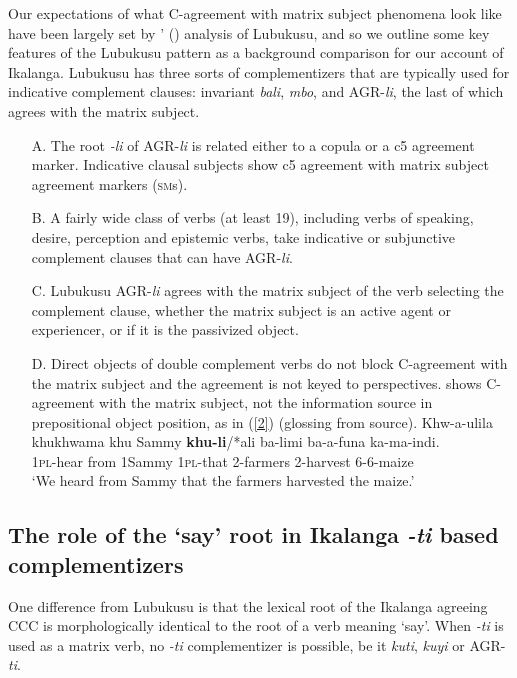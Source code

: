 \documentclass[output=paper,
modfonts
]{langscibook}
\begin{document}
Our expectations of what C-agreement with matrix subject phenomena look like have been largely set by \citeauthor{Diercks2013}' (\citeyear{Diercks2013}) analysis of Lubukusu, and so we outline some key features of the Lubukusu pattern as a background comparison for our account of Ikalanga. Lubukusu has three sorts of complementizers that are typically used for indicative complement clauses: invariant \textit{bali}, \textit{mbo}, and AGR-\textit{li}, the last of which agrees with the matrix subject. 
\begin{enumerate}
\item[A.] The root \textit{-li} of AGR-\textit{li} is related either to a copula or a c5 agreement marker. Indicative clausal subjects show c5 agreement with matrix subject agreement markers (\textsc{sm}s). 
\item[B.] A fairly wide class of verbs (at least 19), including verbs of speaking, desire, perception and epistemic verbs, take indicative or subjunctive complement clauses that can have AGR-\textit{li}. 
\item[C.] Lubukusu AGR-\textit{li} agrees with the matrix subject of the verb selecting the complement clause, whether the matrix subject is an active agent or experiencer, or if it is the passivized object.
\item[D.] Direct objects of double complement verbs do not block C-agreement with the matrix subject and the agreement is not keyed to perspectives. \citet{Diercks2013} shows C-agreement with the matrix subject, not the information source in prepositional object position, as in (\ref{2}) (glossing from source).
\ea \label{2}
\gll Khw-a-ulila  khukhwama khu Sammy  \textbf{khu-li}/*ali ba-limi   ba-a-funa ka-ma-indi. \\
1\textsc{pl}-hear from   1Sammy 1\textsc{pl}-that  2-farmers 2-harvest 6-6-maize \\
\glt `We heard from Sammy that the farmers harvested the maize.'
\z
\end{enumerate}

\subsection{The role of the `say' root in Ikalanga \textit{-ti} based complementizers}

One difference from Lubukusu is that the lexical root of the Ikalanga agreeing CCC is morphologically identical to the root of a verb meaning ‘say’. When \textit{-ti} is used as a matrix verb, no \textit{-ti}  complementizer is possible, be it \textit{kuti}, \textit{kuyi} or AGR-\textit{ti}.
\end{document}
